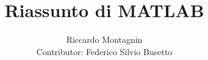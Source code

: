 \documentclass[12pt,a4paper,oneside]{book}
\begin{document}
\title{Riassunto di MATLAB}
\author{Riccardo Montagnin \\ Contributor: Federico Silvio Busetto}
\date{}

\maketitle

\tableofcontents
    \sloppy

\newpage

\newpage

\newpage

\newpage

\newpage

\newpage

\newpage

\end{document}
